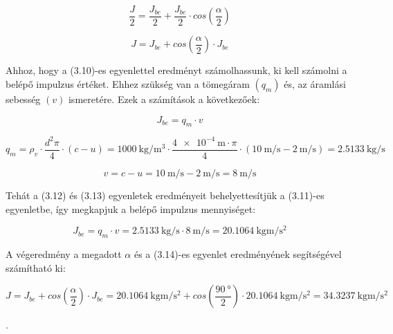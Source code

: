 \begin{equation}
\frac{J}{2}=\frac{J_{be}}{2}+\frac{J_{be}}{2}\cdot{cos\left(\frac{\alpha}{2}\right)}
\end{equation}

\begin{equation}
J=J_{be}+{cos\left(\frac{\alpha}{2}\right)}\cdot{J_{be}}
\end{equation}

\noindent Ahhoz, hogy a (3.10)-es egyenlettel eredményt számolhassunk, ki kell számolni a belépő impulzus értéket. Ehhez szükség van a tömegáram $(q_m)$ és, az áramlási sebesség $(v)$ ismeretére. Ezek a számítások a következőek:

\begin{equation}
J_{be}=q_m\cdot{v}
\end{equation}

\begin{equation}
q_m=\rho_v\cdot{\frac{d^2{\pi}}{4}}\cdot(c-u)=\SI{1000}{\kilo\gram\per\meter\cubed}\cdot{\frac{{\SI{4e-4}{\meter}\cdot{\pi}}}{4}}\cdot(\SI{10}{\meter\per\second}-\SI{2}{\meter\per\second})=\SI{2,5133}{\kilo\gram\per\second}
\end{equation}

\begin{equation}
v=c-u=\SI{10}{\meter\per\second}-\SI{2}{\meter\per\second}=\SI{8}{\meter\per\second}
\end{equation}

\noindent Tehát a (3.12) és (3.13) egyenletek eredményeit behelyettesítjük a (3.11)-es egyenletbe, így megkapjuk a belépő impulzus mennyiséget:

\begin{equation}
J_{be}=q_m\cdot{v}=\SI{2,5133}{\kilo\gram\per\second}\cdot{\SI{8}{\meter\per\second}}=\SI{20,1064}{\kilo\gram\meter\per\second\squared}
\end{equation}

\noindent A végeredmény a megadott $\alpha$ és a (3.14)-es egyenlet eredményének segítségével számítható ki:

\begin{equation}
J=J_{be}+{cos\left(\frac{\alpha}{2}\right)}\cdot{J_{be}}=\SI{20,1064}{\kilo\gram\meter\per\second\squared}+{cos\left(\frac{\SI{90}{\degree}}{2}\right)}\cdot{\SI{20,1064}{\kilo\gram\meter\per\second\squared}=\SI{34,3237}{\kilo\gram\meter\per\second\squared}}
\end{equation}


\noindent{}.

\pagebreak
